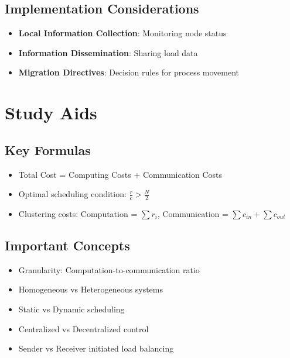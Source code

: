 \documentclass[12pt]{article}
\begin{document}
\subsection{Implementation Considerations}
\begin{itemize}
  \item \textbf{Local Information Collection}: Monitoring node status
  \item \textbf{Information Dissemination}: Sharing load data
  \item \textbf{Migration Directives}: Decision rules for process movement
\end{itemize}

\section*{Study Aids}

\subsection*{Key Formulas}
\begin{itemize}
  \item Total Cost = Computing Costs + Communication Costs
  \item Optimal scheduling condition: $\frac{r}{c} > \frac{N}{2}$
  \item Clustering costs: Computation = $\sum r_i$, Communication = $\sum c_{in} + \sum c_{out}$
\end{itemize}

\subsection*{Important Concepts}
\begin{itemize}
  \item Granularity: Computation-to-communication ratio
  \item Homogeneous vs Heterogeneous systems
  \item Static vs Dynamic scheduling
  \item Centralized vs Decentralized control
  \item Sender vs Receiver initiated load balancing
\end{itemize}
\end{document}
